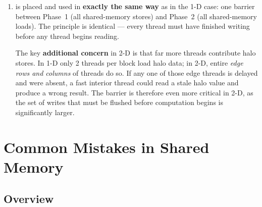 \begin{enumerate}[label=(\alph*)]
\begin{lstlisting}
    // Top halo
    if (ty == 0 && r > 0)
        sA[0][tx + 1] = A[(r - 1) * C + c];

    // Bottom halo
    if (ty == blockDim.y - 1 && r < R - 1)
        sA[blockDim.y + 1][tx + 1] = A[(r + 1) * C + c];

    // Left halo
    if (tx == 0 && c > 0)
        sA[ty + 1][0] = A[r * C + (c - 1)];

    // Right halo
    if (tx == blockDim.x - 1 && c < C - 1)
        sA[ty + 1][blockDim.x + 1] = A[r * C + (c + 1)];

    // Synchronisation barrier
    __syncthreads();

    // Phase 2: stencil computation from shared memory
    if (r > 0 && r < R - 1 && c > 0 && c < C - 1)
        B[r * C + c] = sA[ty][tx + 1]       // above
                     + sA[ty + 1][tx]        // left
                     + sA[ty + 1][tx + 1]    // centre
                     + sA[ty + 1][tx + 2]    // right
                     + sA[ty + 2][tx + 1];   // below
}
\end{lstlisting}

  \item \synct{} is placed and used in \textbf{exactly the same way} as
        in the 1-D case: one barrier between Phase~1 (all shared-memory
        stores) and Phase~2 (all shared-memory loads).  The principle is
        identical — every thread must have finished writing before any
        thread begins reading.

        The key \textbf{additional concern} in 2-D is that far more threads
        contribute halo stores.  In 1-D only 2 threads per block load halo
        data; in 2-D, entire \emph{edge rows and columns} of threads do so.
        If any one of those edge threads is delayed and \synct{} were
        absent, a fast interior thread could read a stale halo value and
        produce a wrong result.  The barrier is therefore even more critical
        in 2-D, as the set of writes that must be flushed before computation
        begins is significantly larger.
\end{enumerate}
\newpage
\section{Common Mistakes in Shared Memory}
\label{sec:common-mistakes}

\subsection{Overview}

